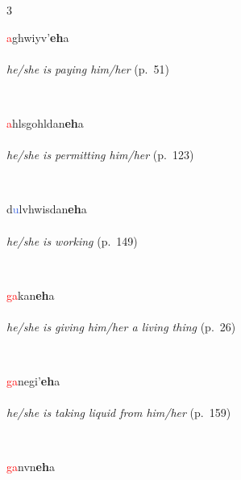 \documentclass[oneside,openany]{book}%
\begin{document}
\noindent\begin{multicols}{3}%
\begin{minipage}[t]{\linewidth}
\raggedright\noindent \textcolor{Red}{a}ghwiyv'\textbf{eh}a\\
\\
\noindent \textit{he/she is paying him/her} (p.~51)
\end{minipage}\\[1em]%
\begin{minipage}[t]{\linewidth}
\raggedright\noindent \textcolor{Red}{a}hlsgohldan\textbf{eh}a\\
\\
\noindent \textit{he/she is permitting him/her} (p.~123)
\end{minipage}\\[1em]%
\begin{minipage}[t]{\linewidth}
\raggedright\noindent d\textcolor{RoyalBlue}{u}lvhwisdan\textbf{eh}a\\
\\
\noindent \textit{he/she is working} (p.~149)
\end{minipage}\\[1em]%
\begin{minipage}[t]{\linewidth}
\raggedright\noindent \textcolor{Red}{ga}kan\textbf{eh}a\\
\\
\noindent \textit{he/she is giving him/her a living thing} (p.~26)
\end{minipage}\\[1em]%
\begin{minipage}[t]{\linewidth}
\raggedright\noindent \textcolor{Red}{ga}negi'\textbf{eh}a\\
\\
\noindent \textit{he/she is taking liquid from him/her} (p.~159)
\end{minipage}\\[1em]%
\begin{minipage}[t]{\linewidth}
\raggedright\noindent \textcolor{Red}{ga}nvn\textbf{eh}a\\
\\

\end{minipage}
\end{multicols}
\end{document}

